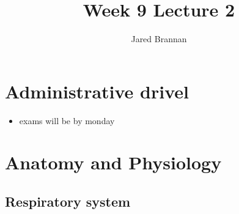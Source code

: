 \documentclass{article}
\title{Week 9 Lecture 2}
\author{Jared Brannan }
\theoremstyle{definition}
\begin{document}
\maketitle

\section{Administrative drivel}
\begin{itemize}
	\item exams will be by monday 
\end{itemize}

\section{Anatomy and Physiology}
\subsection{Respiratory system}
\end{document}
